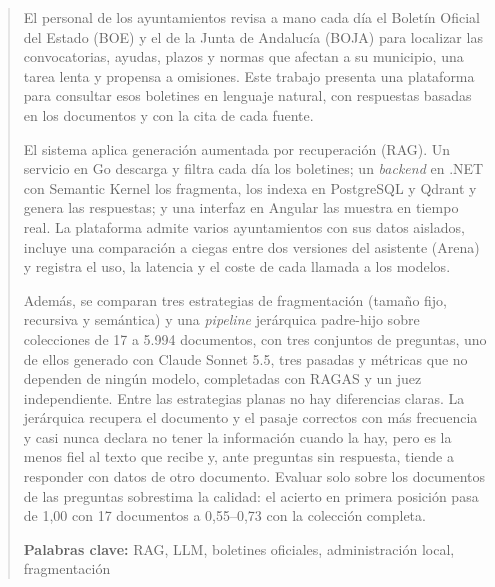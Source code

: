 \renewcommand{\abstractname}{Resumen}
\begin{abstract}
El personal de los ayuntamientos revisa a mano cada día el Boletín Oficial del Estado (BOE) y el de la Junta de Andalucía (BOJA) para localizar las convocatorias, ayudas, plazos y normas que afectan a su municipio, una tarea lenta y propensa a omisiones. Este trabajo presenta una plataforma para consultar esos boletines en lenguaje natural, con respuestas basadas en los documentos y con la cita de cada fuente.

El sistema aplica generación aumentada por recuperación (RAG). Un servicio en Go descarga y filtra cada día los boletines; un \emph{backend} en .NET con Semantic Kernel los fragmenta, los indexa en PostgreSQL y Qdrant y genera las respuestas; y una interfaz en Angular las muestra en tiempo real. La plataforma admite varios ayuntamientos con sus datos aislados, incluye una comparación a ciegas entre dos versiones del asistente (Arena) y registra el uso, la latencia y el coste de cada llamada a los modelos.

Además, se comparan tres estrategias de fragmentación (tamaño fijo, recursiva y semántica) y una \emph{pipeline} jerárquica padre-hijo sobre colecciones de 17 a 5.994 documentos, con tres conjuntos de preguntas, uno de ellos generado con Claude Sonnet 5.5, tres pasadas y métricas que no dependen de ningún modelo, completadas con \mbox{RAGAS} y un juez independiente. Entre las estrategias planas no hay diferencias claras. La jerárquica recupera el documento y el pasaje correctos con más frecuencia y casi nunca declara no tener la información cuando la hay, pero es la menos fiel al texto que recibe y, ante preguntas sin respuesta, tiende a responder con datos de otro documento. Evaluar solo sobre los documentos de las preguntas sobrestima la calidad: el acierto en primera posición pasa de 1,00 con 17 documentos a \mbox{0,55--0,73} con la colección completa.

\medskip
\noindent\raggedright\textbf{Palabras clave:} RAG, LLM, boletines oficiales, administración local, \mbox{fragmentación}
\end{abstract}
